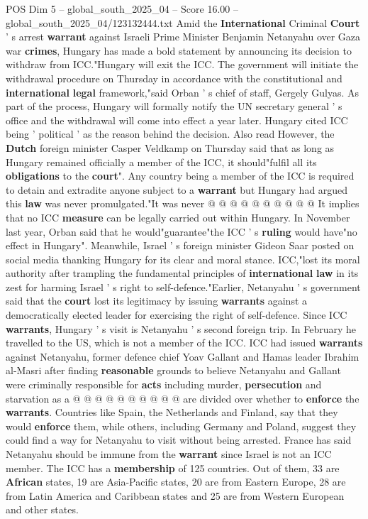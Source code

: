 \begin{textsample}{POS Dim 5 – global\_south\_2025\_04 – Score 16.00 – global\_south\_2025\_04/123132444.txt}  \label{ex:f5_pos_066}
Amid the \textbf{International} Criminal \textbf{Court} ' s arrest \textbf{warrant} against Israeli Prime Minister Benjamin Netanyahu over Gaza war \textbf{crimes}, Hungary has made a bold statement by announcing its decision to withdraw from ICC."Hungary will exit the ICC.
The government will initiate the withdrawal procedure on Thursday in accordance with the constitutional and \textbf{international} \textbf{legal} framework,"said Orban ' s chief of staff, Gergely Gulyas.
As part of the process, Hungary will formally notify the UN secretary general ' s office and the withdrawal will come into effect a year later.
Hungary cited ICC being ' political ' as the reason behind the decision.
Also read However, the \textbf{Dutch} foreign minister Casper Veldkamp on Thursday said that as long as Hungary remained officially a member of the ICC, it should"fulfil all its \textbf{obligations} to the \textbf{court}".
Any country being a member of the ICC is required to detain and extradite anyone subject to a \textbf{warrant} but Hungary had argued this \textbf{law} was never promulgated."It was never @ @ @ @ @ @ @ @ @ @ It implies that no ICC \textbf{measure} can be legally carried out within Hungary.
In November last year, Orban said that he would"guarantee"the ICC ' s \textbf{ruling} would have"no effect in Hungary".
Meanwhile, Israel ' s foreign minister Gideon Saar posted on social media thanking Hungary for its clear and moral stance.
ICC,"lost its moral authority after trampling the fundamental principles of \textbf{international} \textbf{law} in its zest for harming Israel ' s right to self-defence."Earlier, Netanyahu ' s government said that the \textbf{court} lost its legitimacy by issuing \textbf{warrants} against a democratically elected leader for exercising the right of self-defence.
Since ICC \textbf{warrants}, Hungary ' s visit is Netanyahu ' s second foreign trip.
In February he travelled to the US, which is not a member of the ICC.
ICC had issued \textbf{warrants} against Netanyahu, former defence chief Yoav Gallant and Hamas leader Ibrahim al-Masri after finding \textbf{reasonable} grounds to believe Netanyahu and Gallant were criminally responsible for \textbf{acts} including murder, \textbf{persecution} and starvation as a @ @ @ @ @ @ @ @ @ @ are divided over whether to \textbf{enforce} the \textbf{warrants}.
Countries like Spain, the Netherlands and Finland, say that they would \textbf{enforce} them, while others, including Germany and Poland, suggest they could find a way for Netanyahu to visit without being arrested.
France has said Netanyahu should be immune from the \textbf{warrant} since Israel is not an ICC member.
The ICC has a \textbf{membership} of 125 countries.
Out of them, 33 are \textbf{African} states, 19 are Asia-Pacific states, 20 are from Eastern Europe, 28 are from Latin America and Caribbean states and 25 are from Western European and other states.

\end{textsample}
